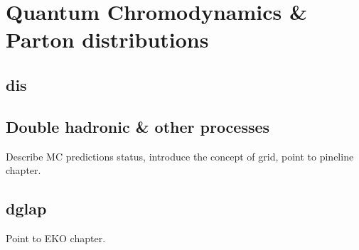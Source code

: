 
\chapter{Quantum Chromodynamics \& Parton distributions}
\label{ch:qcd}
\minitoc
\adjustmtc
\bigskip



\section{\acrlong{dis}}
\label{sec:qcd/dis}


\section{Double hadronic \& other processes}
\label{sec:qcd/dy}


Describe MC predictions status, introduce the concept of grid, point to
pineline chapter.

\section{\acrlong{dglap}}
\label{sec:qcd/dglap}
% 

Point to EKO chapter.

